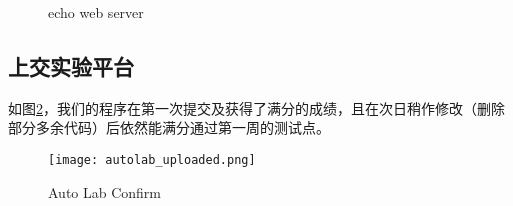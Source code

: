 \begin{figure}[htbp!]
    \centering
    \caption{echo web server}\label{fig:echo web server}
    \vspace{-1em}
\end{figure}

\subsection{上交实验平台}
如图\ref{fig:autolab}，我们的程序在第一次提交及获得了满分的成绩，且在次日稍作修改（删除部分多余代码）后依然能满分通过第一周的测试点。

\begin{figure}[htbp!]
    \centering
    \texttt{[image: autolab\_uploaded.png]}
    \caption{Auto Lab Confirm}\label{fig:autolab}
    \vspace{-1em}
\end{figure}
